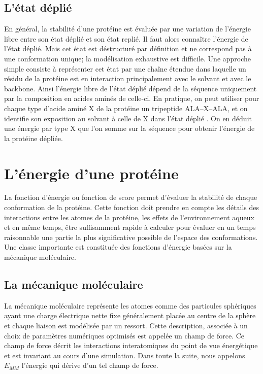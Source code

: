 \subsection{L'état déplié }
\label{sub:deplie}
En général, la stabilité d'une protéine est évaluée par une variation de l'énergie libre entre son état déplié et son état replié. Il faut alors connaître l'énergie de l'état déplié. Mais cet état est déstructuré par définition et ne correspond pas à une conformation unique; la modélisation exhaustive est difficile. Une approche simple consiste à représenter cet état par une chaîne étendue dans laquelle un résidu de la protéine est en interaction principalement avec le solvant et avec le backbone. Ainsi l'énergie libre de l'état déplié dépend de la séquence uniquement par la composition en acides aminés de celle-ci. En pratique, on peut utiliser pour chaque type d'acide aminé X de la protéine  un tripeptide ALA--X--ALA, et on identifie son exposition au solvant à celle de X dans l'état déplié \cite{Dahiyat96}. On en déduit une énergie par type X que l'on somme sur la séquence pour obtenir l'énergie de la protéine dépliée. 

\section{L'énergie d'une protéine}

La fonction d'énergie ou fonction de score permet d'évaluer la stabilité de chaque conformation de la protéine. Cette fonction doit prendre en compte les détails des interactions entre les atomes de la protéine, les effets de l'environnement aqueux et en même temps, être suffisamment rapide à calculer pour évaluer en un temps raisonnable une partie la plus significative possible de l'espace des conformations. Une classe importante est constituée des fonctions d'énergie basées sur la mécanique moléculaire.

\subsection{La mécanique moléculaire}
\label{sub:mecamol}
La mécanique moléculaire représente les atomes comme des particules sphériques ayant une charge électrique nette fixe généralement placée au centre de la sphère et chaque liaison est modélisée par un ressort. Cette description, associée à un choix de paramètres numériques optimisés est appelée un champ de force. Ce champ de force décrit les interactions interatomiques du point de vue énergétique et est invariant au cours d'une simulation.
Dans toute la suite, nous appelons $E_{MM}$ l'énergie qui dérive d'un tel champ de force.

